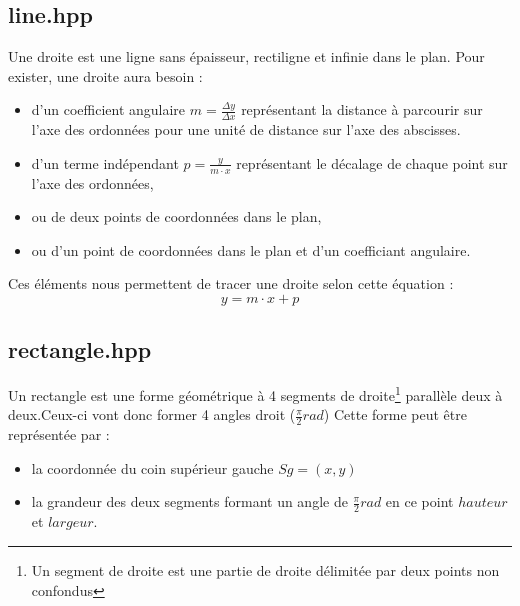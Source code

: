 \documentclass[a4paper,11pt]{report}
\begin{document}
\subsection[Droite]{line.hpp}
\begin{center}
\end{center}
Une droite est une ligne sans épaisseur, rectiligne et infinie dans le plan. 
Pour exister, une droite aura besoin :
\begin{itemize}
	\item d'un coefficient angulaire $m = \frac{\Delta y}{\Delta x}$
		représentant la distance à parcourir sur l'axe des ordonnées pour une unité de
		distance sur l'axe des abscisses.
	\item d'un terme indépendant $p = \frac{y}{m \cdot x}$ représentant le décalage de chaque point
		sur l'axe des ordonnées,
	\item ou de deux points de coordonnées dans le plan,
	\item ou d'un point de coordonnées dans le plan et d'un coefficiant
		angulaire.
\end{itemize}
Ces éléments nous permettent de tracer une droite selon cette équation :
$$ y = m \cdot x + p $$

\subsection[Rectangle]{rectangle.hpp}
\begin{center}
\end{center}
Un rectangle est une forme géométrique à 4 segments de droite\footnote{Un
	segment de droite est une partie de droite délimitée par deux points non
confondus} 
parallèle deux à deux.Ceux-ci vont donc former 4 angles droit ($\frac{\pi}{2} rad$)
Cette forme peut être représentée par :
\begin{itemize}
	\item la coordonnée du coin supérieur gauche $Sg = (x, y)$
	\item la grandeur des deux segments formant un angle de $\frac{\pi}{2} rad$
		en ce point $hauteur$ et $largeur$.
\end{itemize}
\end{document}
